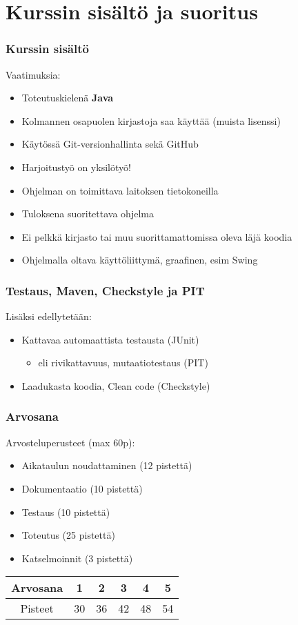 \documentclass[finnish]{beamer}
\begin{document}
	\section{Kurssin sisältö ja suoritus}
	
	\begin{frame}
		\frametitle{Kurssin sisältö}

		Vaatimuksia:
		\begin{itemize}
			\item Toteutuskielenä \textbf{Java}
			\item Kolmannen osapuolen kirjastoja saa käyttää (muista lisenssi)
			\item Käytössä Git-versionhallinta sekä GitHub
			\item Harjoitustyö on yksilötyö!
			\item Ohjelman on toimittava laitoksen tietokoneilla
			\item Tuloksena suoritettava ohjelma
			\item Ei pelkkä kirjasto tai muu suorittamattomissa oleva läjä koodia
			\item Ohjelmalla oltava käyttöliittymä, graafinen, esim Swing
		\end{itemize}
	\end{frame}

	\begin{frame}
		\frametitle{Testaus, Maven, Checkstyle ja PIT}
		
		Lisäksi edellytetään:
		\begin{itemize}
			\item Kattavaa automaattista testausta (JUnit)
			\begin{itemize}
				\item eli rivikattavuus, mutaatiotestaus (PIT)
			\end{itemize}
			\item Laadukasta koodia, Clean code (Checkstyle)
		\end{itemize}

		
	\end{frame}
	
	\begin{frame}
		\frametitle{Arvosana}
		
		Arvosteluperusteet (max 60p):
		\begin{itemize}
			\item Aikataulun noudattaminen (12 pistettä)
			\item Dokumentaatio (10 pistettä)
			\item Testaus (10 pistettä)
			\item Toteutus (25 pistettä)
			\item Katselmoinnit (3 pistettä)
		\end{itemize}
		
		\begin{tabular}{|c|c|c|c|c|c|}
			\hline Arvosana & 1 & 2 & 3 & 4 & 5 \\ 
			\hline Pisteet & 30 & 36 & 42 & 48 & 54 \\ 
			\hline 
		\end{tabular} 
	\end{frame}
	
\end{document}
